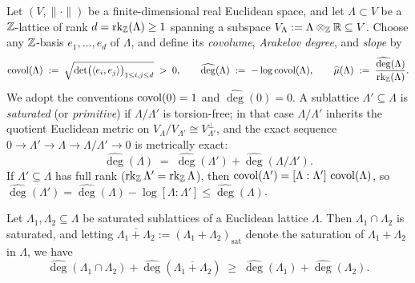 Let $(V, \|\cdot\|)$ be a finite-dimensional real Euclidean space, and let $\Lambda \subset V$ be a $\mathbb{Z}$-lattice of rank $d = \operatorname{rk}_{\mathbb{Z}}(\Lambda) \ge 1$ spanning a subspace $V_\Lambda := \Lambda \otimes_{\mathbb{Z}} \mathbb{R} \subseteq V$. Choose any $\mathbb{Z}$-basis $e_1, \dots, e_d$ of $\Lambda$, and define its \emph{covolume}, \emph{Arakelov degree}, and \emph{slope} by
\begin{equation}
\label{eq:05:euc-covol}
  \operatorname{covol}(\Lambda) \;:=\; \sqrt{\det\bigl(\langle e_i, e_j \rangle\bigr)_{1 \le i, j \le d}} \;>\; 0,
  \qquad
  \widehat{\deg}(\Lambda) \;:=\; -\log \operatorname{covol}(\Lambda),
  \qquad
  \widehat{\mu}(\Lambda) \;:=\; \frac{\widehat{\deg}(\Lambda)}{\operatorname{rk}_{\mathbb{Z}}(\Lambda)}.
\end{equation}
We adopt the conventions $\operatorname{covol}(0) = 1$ and $\widehat{\deg}(0) = 0$. A sublattice $\Lambda' \subseteq \Lambda$ is \emph{saturated} (or \emph{primitive}) if $\Lambda / \Lambda'$ is torsion-free; in that case $\Lambda / \Lambda'$ inherits the quotient Euclidean metric on $V_\Lambda / V_{\Lambda'} \cong V_{\Lambda'}^\perp$, and the exact sequence $0 \to \Lambda' \to \Lambda \to \Lambda / \Lambda' \to 0$ is metrically exact:
\begin{equation}
\label{eq:05:deg-add}
  \widehat{\deg}(\Lambda) \;=\; \widehat{\deg}(\Lambda') + \widehat{\deg}(\Lambda / \Lambda').
\end{equation}
If $\Lambda' \subseteq \Lambda$ has full rank ($\operatorname{rk}_{\mathbb{Z}} \Lambda' = \operatorname{rk}_{\mathbb{Z}} \Lambda$), then $\operatorname{covol}(\Lambda') = [\Lambda : \Lambda']\,\operatorname{covol}(\Lambda)$, so $\widehat{\deg}(\Lambda') = \widehat{\deg}(\Lambda) - \log[\Lambda : \Lambda'] \le \widehat{\deg}(\Lambda)$.

\begin{lemma}
\label{lem:05:supermod}
Let $\Lambda_1, \Lambda_2 \subseteq \Lambda$ be saturated sublattices of a Euclidean lattice $\Lambda$. Then $\Lambda_1 \cap \Lambda_2$ is saturated, and letting $\overline{\Lambda_1 + \Lambda_2} := (\Lambda_1 + \Lambda_2)_{\mathrm{sat}}$ denote the saturation of $\Lambda_1 + \Lambda_2$ in $\Lambda$, we have
\begin{equation}
\label{eq:05:supermod}
  \widehat{\deg}(\Lambda_1 \cap \Lambda_2) + \widehat{\deg}(\overline{\Lambda_1 + \Lambda_2})
  \;\ge\; \widehat{\deg}(\Lambda_1) + \widehat{\deg}(\Lambda_2).
\end{equation}
\end{lemma}

